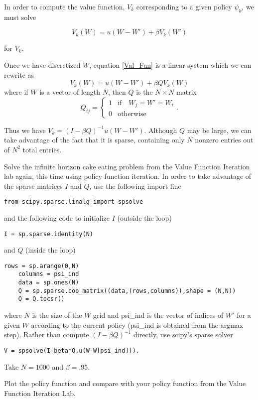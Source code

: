 In order to compute the value function, $V_k$ corresponding to a given policy $\psi_k$, we must solve

\begin{equation}\label{Val_Fun}
V_k(W) = u(W-W') + \beta V_k(W')
\end{equation}

for $V_k$.

Once we have discretized $W$, equation \eqref{Val_Fun} is a linear system which we can rewrite as
\begin{equation}\label{linear}
V_k(W) = u(W-W') + \beta QV_k(W)
\end{equation}
where if $W$ is a vector of length $N$, then $Q$ is the $N\times N$ matrix
\begin{equation}
Q_{ij} = \left\{
     \begin{array}{lr}
       1 & \text{if} \quad  W_j = W' = W_i\\
       0 & \text{otherwise}
     \end{array}
   \right. .
\end{equation}

Thus we have $V_k = (I-\beta Q)^{-1}u(W-W')$.  Although $Q$ may be large, we can take advantage of the fact that it is sparse, containing only $N$ nonzero entries out of $N^2$ total entries.

\begin{problem}
Solve the infinite horizon cake eating problem from the Value Function Iteration lab again, this time using policy function iteration.  In order to take advantage of the sparse matrices $I$ and $Q$, use the following import line

\begin{lstlisting}[style=python]
  from scipy.sparse.linalg import spsolve
\end{lstlisting}

and the following code to initialize $I$ (outside the loop)
\begin{lstlisting}[style=python]
I = sp.sparse.identity(N)
\end{lstlisting}

 and $Q$ (inside the loop)
\begin{lstlisting}[style=python]
    rows = sp.arange(0,N)
    columns = psi_ind
    data = sp.ones(N)
    Q = sp.sparse.coo_matrix((data,(rows,columns)),shape = (N,N))
    Q = Q.tocsr()
\end{lstlisting}
where $N$ is the size of the $W$ grid and psi\_ind is the vector of indices of $W'$ for a given $W$ according to the current policy (psi\_ind is obtained from the argmax step).  Rather than compute $(I-\beta Q)^{-1}$ directly, use scipy's sparse solver

\begin{lstlisting}[style=python]
V = spsolve(I-beta*Q,u(W-W[psi_ind])).
\end{lstlisting}



Take $N = 1000$ and $\beta = .95$.

Plot the policy function and compare with your policy function from the Value Function Iteration Lab.
\end{problem}

